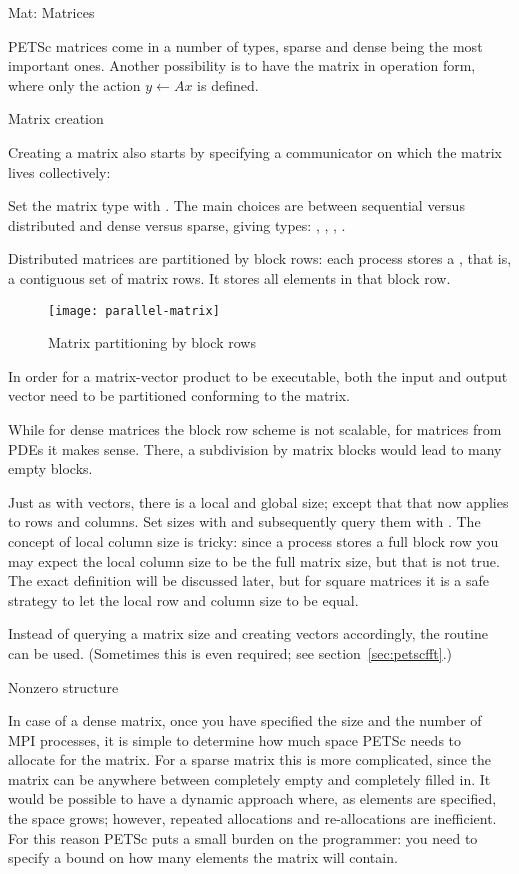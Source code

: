  {Mat: Matrices}

PETSc matrices come in a number of types, sparse and dense being the
most important ones. Another possibility is to have the matrix in
operation form, where only the action $y\leftarrow Ax$ is defined.

 {Matrix creation}
\label{sec:petscmat-create}

Creating a matrix also starts by specifying a communicator on which
the matrix lives collectively:
%

Set the matrix type with .  The main choices
are between sequential versus distributed and dense versus sparse,
giving types: , ,
, .

Distributed matrices are partitioned by block rows: each process
stores a , that is, a contiguous set of matrix
rows. It stores all elements in that block row.
%
\begin{figure}[ht]
  \texttt{[image: parallel-matrix]}
  \caption{Matrix partitioning by block rows}
  \label{fig:parallel-matrix}
\end{figure}
%
In order for a matrix-vector product to be executable, both the input
and output vector need to be partitioned conforming to the matrix.

While for dense matrices the block row scheme is not scalable, for
matrices from \acp{PDE} it makes sense. There, a subdivision by matrix
blocks would lead to many empty blocks.

Just as with vectors, there is a local and global size; except that
that now applies to rows and columns.
Set sizes with
and subsequently query them with
.
The concept of local column size is tricky:
since a process stores a full block row you may expect the local column size
to be the full matrix size, but that is not true.
The exact definition will be discussed later, but for square matrices it is a safe
strategy to let the local row and column size to be equal.

Instead of querying a matrix size and creating vectors accordingly,
the routine  can be used.
(Sometimes this is even required; see section~\ref{sec:petscfft}.)

 {Nonzero structure}

In case of a dense matrix, once you have specified the size and the
number of MPI processes, it is simple to determine how much space PETSc
needs to allocate for the matrix. For a sparse matrix this is more
complicated, since the matrix can be anywhere between completely empty
and completely filled in. It would be possible to have a dynamic
approach where, as elements are specified, the space grows; however,
repeated allocations and re-allocations are inefficient. For this
reason PETSc puts a small burden on the programmer: you need to
specify a bound on how many elements the matrix will contain.

